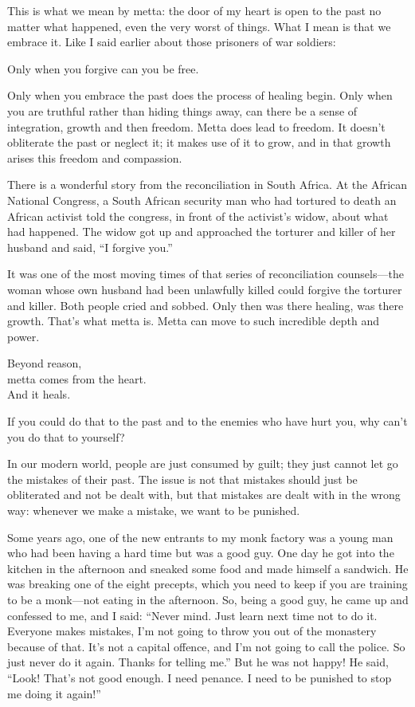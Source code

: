 \documentclass[12pt, openany]{book}
\newenvironment{aphorism}%
{%
\begin{center}\begin{itshape}
}%
{\end{itshape}\end{center}
}%
\begin{document}
This is what we mean by metta: the door of my heart is open to the past no matter what happened, even the very worst of things. What I mean is that we embrace it. Like I said earlier about those prisoners of war soldiers: 

\begin{aphorism}
Only when you forgive can you be free.
\end{aphorism}
Only when you embrace the past does the process of healing begin. Only when you are truthful rather than hiding things away, can there be a sense of integration, growth and then freedom. Metta does lead to freedom. It doesn’t obliterate the past or neglect it; it makes use of it to grow, and in that growth arises this freedom and compassion. 

There is a wonderful story from the reconciliation in South Africa. At the African National Congress, a South African security man who had tortured to death an African activist told the congress, in front of the activist’s widow, about what had happened. The widow got up and approached the torturer and killer of her husband and said, “I forgive you.” 

It was one of the most moving times of that series of reconciliation counsels—the woman whose own husband had been unlawfully killed could forgive the torturer and killer. Both people cried and sobbed. Only then was there healing, was there growth. That’s what metta is. Metta can move to such incredible depth and power. 

\begin{aphorism}
Beyond reason,\\  
metta comes from the heart.\\ 
And it heals.
\end{aphorism}

If you could do that to the past and to the enemies who have hurt you, why can’t you do that to yourself? 

In our modern world, people are just consumed by guilt; they just cannot let go the mistakes of their past. The issue is not that mistakes should just be obliterated and not be dealt with, but that mistakes are dealt with in the wrong way: whenever we make a mistake, we want to be punished. 

Some years ago, one of the new entrants to my monk factory was a young man who had been having a hard time but was a good guy. One day he got into the kitchen in the afternoon and sneaked some food and made himself a sandwich. He was breaking one of the eight precepts, which you need to keep if you are training to be a monk—not eating in the afternoon. So, being a good guy, he came up and confessed to me, and I said: “Never mind. Just learn next time not to do it. Everyone makes mistakes, I’m not going to throw you out of the monastery because of that. It’s not a capital offence, and I’m not going to call the police. So just never do it again. Thanks for telling me.” But he was not happy! He said, “Look! That’s not good enough. I need penance. I need to be punished to stop me doing it again!” 
\end{document}
